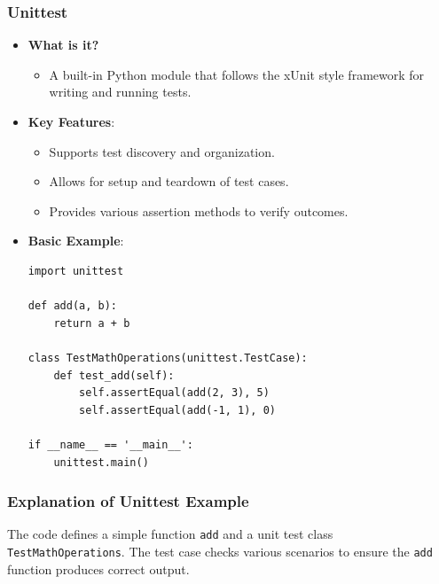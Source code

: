 \documentclass{beamer}
\begin{document}
\begin{frame}[fragile]
    \frametitle{Unittest}
    \begin{itemize}
        \item \textbf{What is it?}
        \begin{itemize}
            \item A built-in Python module that follows the xUnit style framework for writing and running tests.
        \end{itemize}
        
        \item \textbf{Key Features}:
        \begin{itemize}
            \item Supports test discovery and organization.
            \item Allows for setup and teardown of test cases.
            \item Provides various assertion methods to verify outcomes.
        \end{itemize}

        \item \textbf{Basic Example}:
        \begin{lstlisting}
import unittest

def add(a, b):
    return a + b

class TestMathOperations(unittest.TestCase):
    def test_add(self):
        self.assertEqual(add(2, 3), 5)
        self.assertEqual(add(-1, 1), 0)

if __name__ == '__main__':
    unittest.main()
        \end{lstlisting}
    \end{itemize}
\end{frame}

\begin{frame}
    \frametitle{Explanation of Unittest Example}
    The code defines a simple function \texttt{add} and a unit test class \texttt{TestMathOperations}. The test case checks various scenarios to ensure the \texttt{add} function produces correct output.
\end{frame}
\end{document}

